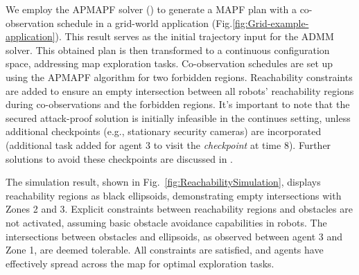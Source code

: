 \documentclass[10pt,twocolumn,twoside]{IEEEtran}
\begin{document}
We employ the APMAPF solver (\cite{wardega2019resilience}) to generate a MAPF plan with a co-observation schedule in a grid-world application (Fig.\ref{fig:Grid-example-application}). %
This result serves as the initial trajectory input for the ADMM solver. This obtained plan is then transformed to a continuous configuration space, addressing map exploration tasks. Co-observation schedules are set up using the APMAPF algorithm for two forbidden regions. Reachability constraints are added to ensure an empty intersection between all robots' reachability regions during co-observations and the forbidden regions. It's important to note that the secured attack-proof solution is initially infeasible in the continues setting, unless additional checkpoints (e.g., stationary security cameras) are incorporated (additional task added for agent 3 to visit the \emph{checkpoint} at time $8$). Further solutions to avoid these checkpoints are discussed in .

The simulation result, shown in Fig.~\ref{fig:ReachabilitySimulation}, displays reachability regions as black ellipsoids, demonstrating empty intersections with Zones 2 and 3. Explicit constraints between reachability regions and obstacles are not activated, assuming basic obstacle avoidance capabilities in robots. The intersections between obstacles and ellipsoids, as observed between agent 3 and Zone 1, are deemed tolerable. All constraints are satisfied, and agents have effectively spread across the map for optimal exploration tasks.


\end{document}
